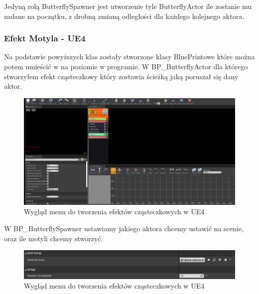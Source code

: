 \documentclass[a4paper,12pt,reqno]{article}
\begin{document}


Jedyną rolą ButterflySpawner jest utworzenie tyle ButterflyActor ile zostanie mu zadane na początku, z drobną zmianą odległości dla każdego kolejnego aktora.




\subsubsection{Efekt Motyla - UE4}

Na podstawie powyższych klas zostały stworzone klasy BluePrintowe które można potem umieścić w na poziomie w programie. W BP\_ButterflyActor dla którego stworzyłem efekt cząsteczkowy który zostawia ścieżką jaką poruszał się dany aktor.

\begin{figure}[H]%
\centering
\includegraphics[width=0.7\columnwidth]{graphics/butterfly/ButterflyParticleSystem.png}
\caption{Wygląd menu do tworzenia efektów cząsteczkowych w UE4 
\label{BPExample}}%
%
\qquad
\end{figure} 


W BP\_ButterflySpawner ustawiamy jakiego aktora chcemy ustawić na scenie, oraz ile motyli chcemy stworzyć.

\begin{figure}[H]%
\centering
\includegraphics[width=0.7\columnwidth]{graphics/butterfly/ButterflySpawner.png}
\caption{Wygląd menu do tworzenia efektów cząsteczkowych w UE4 
\label{BPExample}}%
%
\qquad
\end{figure} 


\newpage
\end{document}
